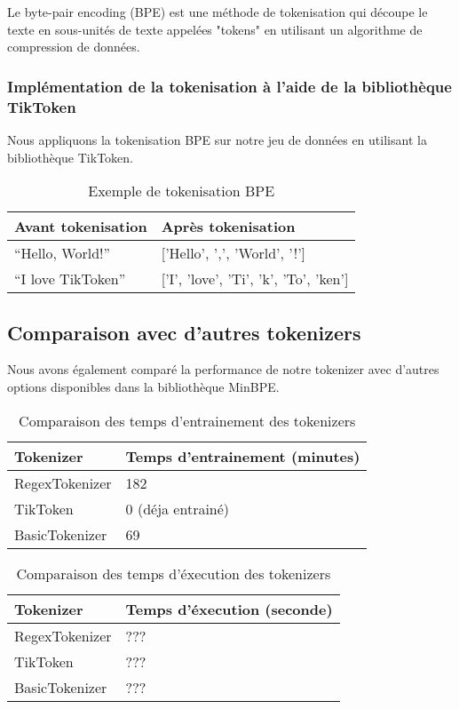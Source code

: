 Le byte-pair encoding (BPE) est une méthode de tokenisation qui découpe le texte en sous-unités de texte appelées "tokens" en utilisant un algorithme de compression de données.

\subsubsection*{Implémentation de la tokenisation à l'aide de la bibliothèque TikToken}

Nous appliquons la tokenisation BPE sur notre jeu de données en utilisant la bibliothèque TikToken.

\begin{table}[h]
\centering
\begin{tabular}{|l|l|}
\hline
\textbf{Avant tokenisation} & \textbf{Après tokenisation} \\ \hline
``Hello, World!'' & ['Hello', ',', 'World', '!'] \\ \hline
``I love TikToken'' & ['I', 'love', 'Ti', 'k', 'To', 'ken'] \\ \hline
\end{tabular}
\caption{Exemple de tokenisation BPE}
\end{table}

\subsection{Comparaison avec d'autres tokenizers}

Nous avons également comparé la performance de notre tokenizer avec d'autres options disponibles dans la bibliothèque MinBPE.

\begin{table}[h]
\centering
\begin{tabular}{|l|l|}
\hline
\textbf{Tokenizer} & \textbf{Temps d'entrainement (minutes)} \\ \hline
RegexTokenizer & 182 \\ \hline
TikToken & 0 (déja entrainé) \\ \hline
BasicTokenizer & 69 \\ \hline
\end{tabular}
\caption{Comparaison des temps d'entrainement des tokenizers}
\end{table}


\begin{table}[h]
\centering
\begin{tabular}{|l|l|}
\hline
\textbf{Tokenizer} & \textbf{Temps d'éxecution (seconde)} \\ \hline
RegexTokenizer & ??? \\ \hline
TikToken & ??? \\ \hline
BasicTokenizer & ??? \\ \hline
\end{tabular}
\caption{Comparaison des temps d'éxecution des tokenizers}
\end{table}


